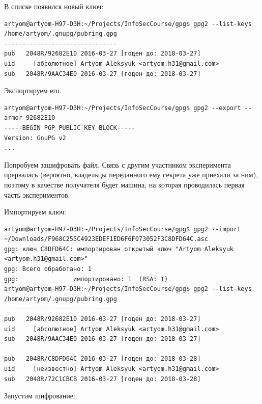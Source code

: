 В списке появился новый ключ:

\begin{lstlisting}
artyom@artyom-H97-D3H:~/Projects/InfoSecCourse/gpg$ gpg2 --list-keys
/home/artyom/.gnupg/pubring.gpg
-------------------------------
pub   2048R/92682E10 2016-03-27 [годен до: 2018-03-27]
uid     [абсолютное] Artyom Aleksyuk <artyom.h31@gmail.com>
sub   2048R/9AAC34E0 2016-03-27 [годен до: 2018-03-27]
\end{lstlisting}

Экспортируем его.

\begin{lstlisting}
artyom@artyom-H97-D3H:~/Projects/InfoSecCourse/gpg$ gpg2 --export --armor 92682E10
-----BEGIN PGP PUBLIC KEY BLOCK-----
Version: GnuPG v2
...
\end{lstlisting}

Попробуем зашифровать файл. Связь с другим участником эксперимента прервалась (вероятно, владельцы переданного ему секрета уже приехали за ним), поэтому в качестве получателя будет машина, на которая проводилась первая часть экспериментов.

Импортируем ключ:

\begin{lstlisting}  
artyom@artyom-H97-D3H:~/Projects/InfoSecCourse/gpg$ gpg2 --import ~/Downloads/F968C255C4923EDEF1ED6F6F073052F3C8DFD64C.asc 
gpg: ключ C8DFD64C: импортирован открытый ключ "Artyom Aleksyuk <artyom.h31@gmail.com>"
gpg: Всего обработано: 1
gpg:               импортировано: 1  (RSA: 1)
artyom@artyom-H97-D3H:~/Projects/InfoSecCourse/gpg$ gpg2 --list-keys
/home/artyom/.gnupg/pubring.gpg
-------------------------------
pub   2048R/92682E10 2016-03-27 [годен до: 2018-03-27]
uid     [абсолютное] Artyom Aleksyuk <artyom.h31@gmail.com>
sub   2048R/9AAC34E0 2016-03-27 [годен до: 2018-03-27]

pub   2048R/C8DFD64C 2016-03-27 [годен до: 2018-03-28]
uid     [неизвестно] Artyom Aleksyuk <artyom.h31@gmail.com>
sub   2048R/72C1CBCB 2016-03-27 [годен до: 2018-03-28]
\end{lstlisting}

Запустим шифрование:

